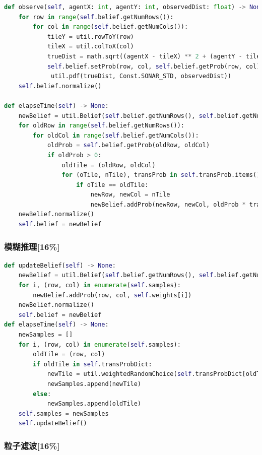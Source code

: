 \documentclass{article}
\begin{document}
\begin{lstlisting}[language=Python]
def observe(self, agentX: int, agentY: int, observedDist: float) -> None:
	for row in range(self.belief.getNumRows()):
		for col in range(self.belief.getNumCols()):
			tileY = util.rowToY(row)
			tileX = util.colToX(col)
			trueDist = math.sqrt((agentX - tileX) ** 2 + (agentY - tileY) ** 2)
			self.belief.setProb(row, col, self.belief.getProb(row, col) *
			 util.pdf(trueDist, Const.SONAR_STD, observedDist))
	self.belief.normalize()

def elapseTime(self) -> None:
	newBelief = util.Belief(self.belief.getNumRows(), self.belief.getNumCols(), 0)
	for oldRow in range(self.belief.getNumRows()):
		for oldCol in range(self.belief.getNumCols()):
			oldProb = self.belief.getProb(oldRow, oldCol)
			if oldProb > 0:  
				oldTile = (oldRow, oldCol)
				for (oTile, nTile), transProb in self.transProb.items():
					if oTile == oldTile: 
						newRow, newCol = nTile
						newBelief.addProb(newRow, newCol, oldProb * transProb)
	newBelief.normalize()
	self.belief = newBelief
\end{lstlisting}



\subsubsection{模糊推理[16\%]}

\begin{lstlisting}[language=Python]
def updateBelief(self) -> None:
	newBelief = util.Belief(self.belief.getNumRows(), self.belief.getNumCols(), 0)
	for i, (row, col) in enumerate(self.samples):
		newBelief.addProb(row, col, self.weights[i])
	newBelief.normalize()
	self.belief = newBelief
def elapseTime(self) -> None:
	newSamples = []
	for i, (row, col) in enumerate(self.samples):
		oldTile = (row, col)
		if oldTile in self.transProbDict:
			newTile = util.weightedRandomChoice(self.transProbDict[oldTile])
			newSamples.append(newTile)
		else:
			newSamples.append(oldTile)
	self.samples = newSamples
	self.updateBelief()
\end{lstlisting}

\subsubsection{粒子滤波[16\%]}
\end{document}
